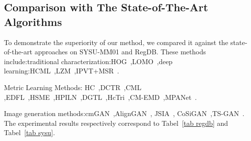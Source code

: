 \documentclass[journal]{IEEEtran}
\begin{document}
\subsection{Comparison with The State-of-The-Art Algorithms}

To demonstrate the superiority of our method, we compared it against the state-of-the-art approaches on SYSU-MM01 and RegDB. These methods include:traditional characterization:HOG~\cite{dalal2005histograms},LOMO~\cite{liao2015person},deep learning:HCML~\cite{ye2018hierarchical},LZM~\cite{basaran2020efficient},IPVT+MSR~\cite{kang2019person}.

Metric Learning Methods: HC~\cite{zhu2020hetero},DCTR~\cite{ye2018visible},CML~\cite{ling2020class}
,EDFL~\cite{liu2020enhancing},HSME~\cite{hao2019hsme},HPILN~\cite{zhao2019hpiln},DGTL~\cite{liu2021strong},HcTri~\cite{liu2020parameter},CM-EMD~\cite{ling2022cross},MPANet~\cite{wu2021discover}.

Image generation methods:cmGAN~\cite{dai2018cross},AlignGAN~\cite{wang2019rgb},
JSIA~\cite{wang2020cross}, CoSiGAN~\cite{zhong2020visible},TS-GAN~\cite{zhang2021rgb}.
The experimental results respectively correspond to Tabel~\ref{tab regdb} and Tabel~\ref{tab sysu}.
\end{document}
